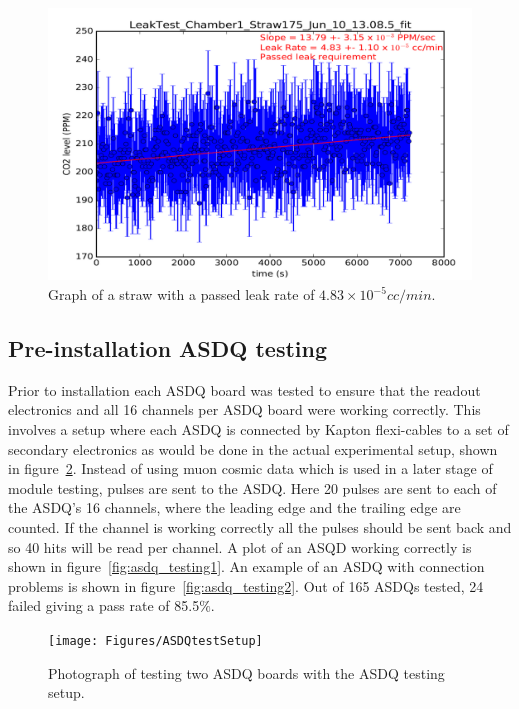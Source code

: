 \begin{figure}[ht]
\centering
\includegraphics[scale=0.62]{Figures/leaktestplot}
\decoRule
\caption{Graph of a straw with a passed leak rate of $4.83\times10^{-5}cc/min$.}
\label{fig:leaktestplot}
\end{figure}

\subsection {Pre-installation ASDQ testing}

Prior to installation each ASDQ board was tested to ensure that the readout electronics and all 16 channels per ASDQ board were working correctly. This involves a setup where each ASDQ is connected by Kapton flexi-cables to a set of  secondary electronics as would be done in the actual experimental setup, shown in figure~\ref{fig:ASDQtestSetup}. Instead of using muon cosmic data which is used in a later stage of module testing, pulses are sent to the ASDQ. Here 20 pulses are sent to each of the ASDQ’s 16 channels, where the leading edge and the trailing edge are counted. If the channel is working correctly all the pulses should be sent back and so 40 hits will be read per channel. A plot of an ASQD working correctly is shown in figure~\ref{fig:asdq_testing1}. An example of an ASDQ with connection problems is shown in figure~\ref{fig:asdq_testing2}. Out of 165 ASDQs tested, 24 failed giving a pass rate of 85.5$\%$.

\begin{figure}[ht]
\centering
\texttt{[image: Figures/ASDQtestSetup]}
\decoRule
\caption{Photograph of testing two ASDQ boards with the ASDQ testing setup.}
\label{fig:ASDQtestSetup}
\end{figure}


